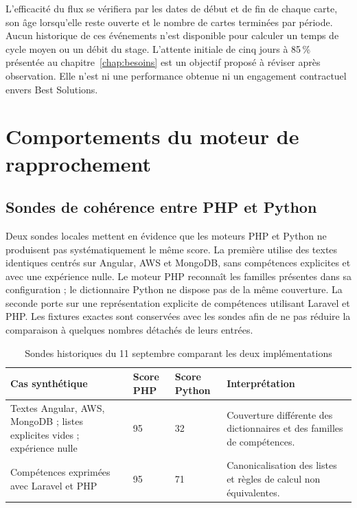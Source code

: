 L'efficacité du flux se vérifiera par les dates de début et de fin de chaque carte, son âge lorsqu'elle reste ouverte et le nombre de cartes terminées par période. Aucun historique de ces événements n'est disponible pour calculer un temps de cycle moyen ou un débit du stage. L'attente initiale de cinq jours à 85\,\% présentée au chapitre~\ref{chap:besoins} est un objectif proposé à réviser après observation. Elle n'est ni une performance obtenue ni un engagement contractuel envers Best Solutions.

\section{Comportements du moteur de rapprochement}

\subsection{Sondes de cohérence entre PHP et Python}

Deux sondes locales mettent en évidence que les moteurs PHP et Python ne produisent pas systématiquement le même score. La première utilise des textes identiques centrés sur Angular, AWS et MongoDB, sans compétences explicites et avec une expérience nulle. Le moteur PHP reconnaît les familles présentes dans sa configuration ; le dictionnaire Python ne dispose pas de la même couverture. La seconde porte sur une représentation explicite de compétences utilisant Laravel et PHP. Les fixtures exactes sont conservées avec les sondes afin de ne pas réduire la comparaison à quelques nombres détachés de leurs entrées.

\begin{table}[htbp]
\centering
\small
\caption{Sondes historiques du 11 septembre comparant les deux implémentations}
\label{tab:validation-scores}
\begin{tabularx}{\textwidth}{@{}Xp{}P{0.14\textwidth}P{0.25\textwidth}@{}}
\toprule
Cas synthétique & Score PHP & Score Python & Interprétation \\
\midrule
Textes Angular, AWS, MongoDB ; listes explicites vides ; expérience nulle & 95 & 32 & Couverture différente des dictionnaires et des familles de compétences. \\
Compétences exprimées avec Laravel et PHP & 95 & 71 & Canonicalisation des listes et règles de calcul non équivalentes. \\
\bottomrule
\end{tabularx}
\end{table}

